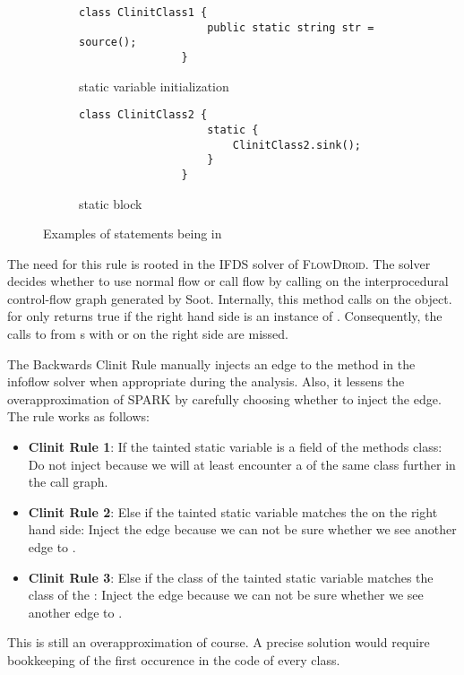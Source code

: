 \documentclass[../draft.tex]{subfiles}
\begin{document}
    \begin{figure}[ht]
        \centering
        \begin{subfigure}[b]{0.45\textwidth}
            \centering
            \begin{lstlisting}[gobble=16]
                class ClinitClass1 {
                    public static string str = source();
                }
            \end{lstlisting}
            \caption{static variable initialization}
            \label{lst:clinit_examples_a}
        \end{subfigure}
        \hfill
        \begin{subfigure}[b]{0.45\textwidth}
            \centering
            \begin{lstlisting}[gobble=16]
                class ClinitClass2 {
                    static {
                        ClinitClass2.sink();
                    }
                }
            \end{lstlisting}
            \caption{static block}
            \label{lst:clinit_examples_b}
        \end{subfigure}
        \caption{Examples of statements being in }
        \label{lst:clinit_examples}
    \end{figure}


    The need for this rule is rooted in the IFDS solver of \textsc{FlowDroid}. The solver decides whether to use normal flow or call flow by calling  on the interprocedural control-flow graph generated by Soot. Internally, this method calls  on the  object.  for  only returns true if the right hand side is an instance of . Consequently, the calls to  from s with  or  on the right side are missed.

    The Backwards Clinit Rule manually injects an edge to the  method in the infoflow solver when appropriate during the analysis. Also, it lessens the overapproximation of SPARK by carefully choosing whether to inject the edge. The rule works as follows:
    \begin{itemize}
        \item \textbf{Clinit Rule 1}: If the tainted static variable is a field of the methods class: Do not inject because we will at least encounter a  of the same class further in the call graph.
        \item \textbf{Clinit Rule 2}: Else if the tainted static variable matches the  on the right hand side: Inject the edge because we can not be sure whether we see another edge to .
        \item \textbf{Clinit Rule 3}: Else if the class of the tainted static variable matches the class of the : Inject the edge because we can not be sure whether we see another edge to .
    \end{itemize}
    This is still an overapproximation of course. A precise solution would require bookkeeping of the first occurence in the code of every class. 
\end{document}
